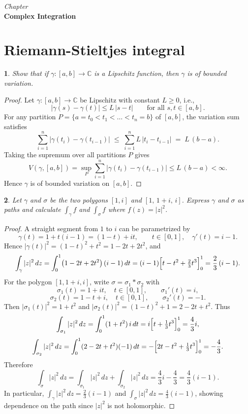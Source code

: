 \documentclass[12pt, a4paper]{report}
\newcommand{\chapter}[1]{%
  \par\vspace{2em}%
  \refstepcounter{section}%
  \begin{center}
    \textit{Chapter \thesection} \\[1.5ex]
    \textbf{#1}
  \end{center}
  \vspace{1em}%
}
\theoremstyle{spaced}
\newtheorem{exercise}{}
\newcommand{\setexercise}[1]{\setcounter{exercise}{#1-1}}
\begin{document}
\chapter{Complex Integration}

\section{Riemann-Stieltjes integral}

\setexercise{6}
\begin{exercise}
	Show that if $\gamma : [a,b] \to \mathbb{C}$ is a Lipschitz function, then $\gamma$ is of bounded variation.
\end{exercise}

\begin{proof}
	Let $\gamma:[a,b]\to\mathbb{C}$ be Lipschitz with constant $L\ge 0$, i.e.,
	\[
		|\gamma(s)-\gamma(t)|\le L\,|s-t| \qquad \text{for all } s,t\in[a,b].
	\]
	For any partition $P=\{a=t_0<t_1<\dots<t_n=b\}$ of $[a,b]$, the variation sum satisfies
	\[
		\sum_{i=1}^n \bigl|\gamma(t_i)-\gamma(t_{i-1})\bigr|
		\;\le\; \sum_{i=1}^n L\,|t_i-t_{i-1}|
		\;=\; L\,(b-a).
	\]
	Taking the supremum over all partitions $P$ gives
	\[
		V(\gamma,[a,b])
		=\sup_P \sum_{i=1}^n \bigl|\gamma(t_i)-\gamma(t_{i-1})\bigr|
		\le L\,(b-a)<\infty.
	\]
	Hence $\gamma$ is of bounded variation on $[a,b]$.
\end{proof}


\setexercise{8}
\begin{exercise}
	Let $\gamma$ and $\sigma$ be the two polygons $[1,i]$ and $[1,\,1+i,\,i]$. Express $\gamma$ and $\sigma$ as paths and calculate $\int_\gamma f$ and $\int_\sigma f$ where $f(z)=|z|^{2}$.
\end{exercise}

\begin{proof}
	A straight segment from \(1\) to \(i\) can be parametrized by
	\[
		\gamma(t)=1+t(i-1)=(1-t)+it,\qquad t\in[0,1],\quad \gamma'(t)=i-1.
	\]
	Hence \(|\gamma(t)|^2=(1-t)^2+t^2=1-2t+2t^2\), and
	\[
		\int_\gamma |z|^2\,dz
		=\int_0^1 \bigl(1-2t+2t^2\bigr)\,(i-1)\,dt
		=(i-1)\Bigl[t-t^2+\tfrac{2}{3}t^3\Bigr]_0^1
		=\frac{2}{3}\,(i-1).
	\]
	For the polygon \( [1,1+i,i]\), write \(\sigma=\sigma_1*\sigma_2\) with
	\[
		\sigma_1(t)=1+it,\quad t\in[0,1],\qquad \sigma_1'(t)=i,
	\]
	\[
		\sigma_2(t)=1-t+i,\quad t\in[0,1],\qquad \sigma_2'(t)=-1.
	\]
	Then \(|\sigma_1(t)|^2=1+t^2\) and \(|\sigma_2(t)|^2=(1-t)^2+1=2-2t+t^2\). Thus
	\[
		\int_{\sigma_1} |z|^2\,dz=\int_0^1(1+t^2)\,i\,dt
		=i\Bigl[t+\tfrac{1}{3}t^3\Bigr]_0^1=\frac{4}{3}i,
	\]
	\[
		\int_{\sigma_2} |z|^2\,dz=\int_0^1(2-2t+t^2)(-1)\,dt
		=-\Bigl[2t-t^2+\tfrac{1}{3}t^3\Bigr]_0^1=-\frac{4}{3}.
	\]
	Therefore
	\[
		\int_\sigma |z|^2\,dz=\int_{\sigma_1}|z|^2\,dz+\int_{\sigma_2}|z|^2\,dz
		=\frac{4}{3}i-\frac{4}{3}=\frac{4}{3}(i-1).
	\]
	In particular, \(\displaystyle \int_\gamma |z|^2\,dz=\frac{2}{3}(i-1)\) and
	\(\displaystyle \int_\sigma |z|^2\,dz=\frac{4}{3}(i-1)\), showing dependence on the path since \( |z|^2 \) is not holomorphic.
\end{proof}
\end{document}
